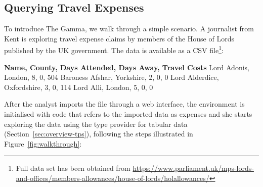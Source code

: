 \documentclass[manuscript,review,anonymous]{acmart}
\newcommand{\ikvd}[1]{{\fontfamily{zi4}\selectfont\small #1}}
\begin{document}
\subsection{Querying Travel Expenses}
\label{sec:overview-walk}

To introduce The Gamma, we walk through a simple scenario.
A journalist from Kent is exploring travel expense claims by members of the House of Lords published
by the UK government. The data is available as a CSV file\footnote{Full data set has been obtained from
\url{https://www.parliament.uk/mps-lords-and-offices/members-allowances/house-of-lords/holallowances/} }:

\begin{thegamma}
\textbf{Name, County, Days Attended, Days Away, Travel Costs}
Lord Adonis, London, 8, 0, 504
Baroness Afshar, Yorkshire, 2, 0, 0
Lord Alderdice, Oxfordshire, 3, 0, 114
Lord Alli, London, 5, 0, 0
\end{thegamma}

\noindent
After the analyst imports the file through a web interface,
the environment is initialised with code that refers to the imported data as \ikvd{expenses}
and she starts exploring the data using the type provider for tabular data (Section~\ref{sec:overview-tps}),
following the steps illustrated in Figure~\ref{fig:walkthrough}:
\end{document}
